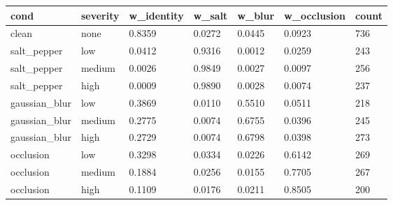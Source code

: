 \begin{tabular}{lllllll}
\hline
cond & severity & w\_identity & w\_salt & w\_blur & w\_occlusion & count \\
\hline
clean & none & 0.8359 & 0.0272 & 0.0445 & 0.0923 & 736 \\
salt\_pepper & low & 0.0412 & 0.9316 & 0.0012 & 0.0259 & 243 \\
salt\_pepper & medium & 0.0026 & 0.9849 & 0.0027 & 0.0097 & 256 \\
salt\_pepper & high & 0.0009 & 0.9890 & 0.0028 & 0.0074 & 237 \\
gaussian\_blur & low & 0.3869 & 0.0110 & 0.5510 & 0.0511 & 218 \\
gaussian\_blur & medium & 0.2775 & 0.0074 & 0.6755 & 0.0396 & 245 \\
gaussian\_blur & high & 0.2729 & 0.0074 & 0.6798 & 0.0398 & 273 \\
occlusion & low & 0.3298 & 0.0334 & 0.0226 & 0.6142 & 269 \\
occlusion & medium & 0.1884 & 0.0256 & 0.0155 & 0.7705 & 267 \\
occlusion & high & 0.1109 & 0.0176 & 0.0211 & 0.8505 & 200 \\
\hline
\end{tabular}
